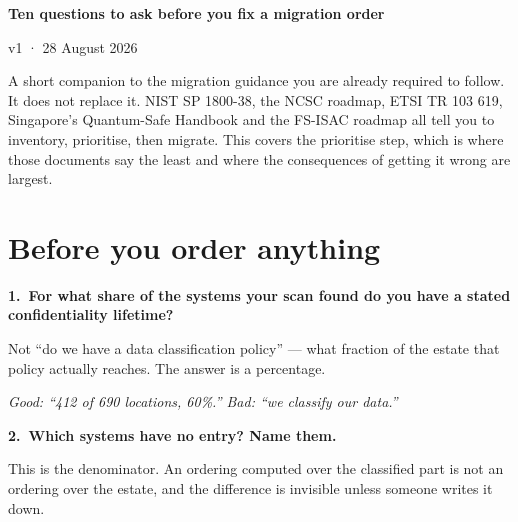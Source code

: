 \documentclass[10pt,a4paper]{article}
\newcommand{\ansbox}{\vspace{2pt}\fbox{\parbox[t][22pt][t]{\dimexpr\linewidth-2\fboxsep-2\fboxrule}{%
  \scriptsize\color{gray}answer}}\par\vspace{4pt}}
\begin{document}
{\LARGE\bfseries Ten questions to ask before you fix a migration order}\par
{\small\color{gray}v1 · 28 August 2026}\par\vspace{6pt}
{\small A short companion to the migration guidance you are already required to follow. It does not replace it. NIST SP 1800-38, the NCSC roadmap, ETSI TR 103 619, Singapore's Quantum-Safe Handbook and the FS-ISAC roadmap all tell you to inventory, prioritise, then migrate. This covers the prioritise step, which is where those documents say the least and where the consequences of getting it wrong are largest.\par}
\vspace{4pt}\vspace{4pt}
\section*{Before you order anything}
\textbf{1.\ For what share of the systems your scan found do you have a stated confidentiality lifetime?}\par
{\small\color{black!70} Not ``do we have a data classification policy'' --- what fraction of the estate that policy actually reaches. The answer is a percentage.\par}
{\footnotesize\itshape\color{black!55} Good: ``412 of 690 locations, 60\%.''   Bad: ``we classify our data.''\par}
\ansbox
\textbf{2.\ Which systems have no entry? Name them.}\par
{\small\color{black!70} This is the denominator. An ordering computed over the classified part is not an ordering over the estate, and the difference is invisible unless someone writes it down.\par}
\ansbox
\end{document}
